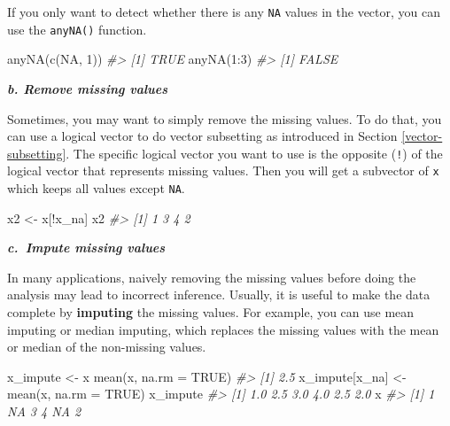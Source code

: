 \documentclass[
]{book}
\newenvironment{Shaded}{\begin{snugshade}}{\end{snugshade}}
\newcommand{\AttributeTok}[1]{\textcolor[rgb]{0.77,0.63,0.00}{#1}}
\newcommand{\CommentTok}[1]{\textcolor[rgb]{0.56,0.35,0.01}{\textit{#1}}}
\newcommand{\ConstantTok}[1]{\textcolor[rgb]{0.00,0.00,0.00}{#1}}
\newcommand{\DecValTok}[1]{\textcolor[rgb]{0.00,0.00,0.81}{#1}}
\newcommand{\FunctionTok}[1]{\textcolor[rgb]{0.00,0.00,0.00}{#1}}
\newcommand{\NormalTok}[1]{#1}
\newcommand{\OtherTok}[1]{\textcolor[rgb]{0.56,0.35,0.01}{#1}}
\newcommand{\SpecialCharTok}[1]{\textcolor[rgb]{0.00,0.00,0.00}{#1}}
\begin{document}
If you only want to detect whether there is any \texttt{NA} values in the vector, you can use the \texttt{anyNA()} function.

\begin{Shaded}
\begin{Highlighting}[]
\FunctionTok{anyNA}\NormalTok{(}\FunctionTok{c}\NormalTok{(}\ConstantTok{NA}\NormalTok{, }\DecValTok{1}\NormalTok{))}
\CommentTok{\#\textgreater{} [1] TRUE}
\FunctionTok{anyNA}\NormalTok{(}\DecValTok{1}\SpecialCharTok{:}\DecValTok{3}\NormalTok{)}
\CommentTok{\#\textgreater{} [1] FALSE}
\end{Highlighting}
\end{Shaded}

\textbf{\emph{b. Remove missing values}}

Sometimes, you may want to simply remove the missing values. To do that, you can use a logical vector to do vector subsetting as introduced in Section \ref{vector-subsetting}. The specific logical vector you want to use is the opposite (\texttt{!}) of the logical vector that represents missing values. Then you will get a subvector of \texttt{x} which keeps all values except \texttt{NA}.

\begin{Shaded}
\begin{Highlighting}[]
\NormalTok{x2 }\OtherTok{\textless{}{-}}\NormalTok{ x[}\SpecialCharTok{!}\NormalTok{x\_na]}
\NormalTok{x2}
\CommentTok{\#\textgreater{} [1] 1 3 4 2}
\end{Highlighting}
\end{Shaded}

\textbf{\emph{c.~Impute missing values}}

In many applications, naively removing the missing values before doing the analysis may lead to incorrect inference. Usually, it is useful to make the data complete by \textbf{imputing} the missing values. For example, you can use mean imputing or median imputing, which replaces the missing values with the mean or median of the non-missing values.

\begin{Shaded}
\begin{Highlighting}[]
\NormalTok{x\_impute }\OtherTok{\textless{}{-}}\NormalTok{ x}
\FunctionTok{mean}\NormalTok{(x, }\AttributeTok{na.rm =} \ConstantTok{TRUE}\NormalTok{)}
\CommentTok{\#\textgreater{} [1] 2.5}
\NormalTok{x\_impute[x\_na] }\OtherTok{\textless{}{-}} \FunctionTok{mean}\NormalTok{(x, }\AttributeTok{na.rm =} \ConstantTok{TRUE}\NormalTok{)}
\NormalTok{x\_impute}
\CommentTok{\#\textgreater{} [1] 1.0 2.5 3.0 4.0 2.5 2.0}
\NormalTok{x}
\CommentTok{\#\textgreater{} [1]  1 NA  3  4 NA  2}
\end{Highlighting}
\end{Shaded}
\end{document}
